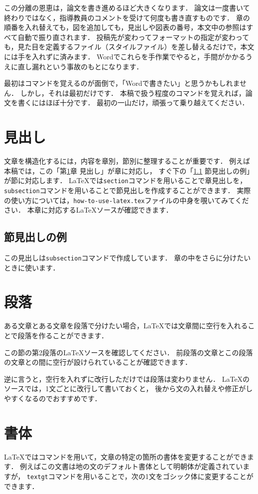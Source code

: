 \documentclass{simplepaper}
\begin{document}
この分離の恩恵は，論文を書き進めるほど大きくなります．
論文は一度書いて終わりではなく，指導教員のコメントを受けて何度も書き直すものです．
章の順番を入れ替えても，図を追加しても，見出しや図表の番号，本文中の参照はすべて自動で振り直されます．
投稿先が変わってフォーマットの指定が変わっても，見た目を定義するファイル（スタイルファイル）を差し替えるだけで，本文には手を入れずに済みます．
Wordでこれらを手作業でやると，手間がかかるうえに直し漏れという事故のもとになります．

最初はコマンドを覚えるのが面倒で，「Wordで書きたい」と思うかもしれません．
しかし，それは最初だけです．
本稿で扱う程度のコマンドを覚えれば，論文を書くにはほぼ十分です．
最初の一山だけ，頑張って乗り越えてください．


\section{見出し}
\label{sec:heading}
文章を構造化するには，内容を章別，節別に整理することが重要です．
例えば本稿では，この「第\ref{sec:heading}章 見出し」が章に対応し，
すぐ下の「\ref{sec:heading-example} 節見出しの例」が節に対応します．
LaTeXでは\texttt{section}コマンドを用いることで章見出しを，
\texttt{subsection}コマンドを用いることで節見出しを作成することができます．
実際の使い方については，\texttt{how-to-use-latex.tex}ファイルの中身を覗いてみてください．
本章に対応するLaTeXソースが確認できます．

\subsection{節見出しの例}
\label{sec:heading-example}
この見出しは\texttt{subsection}コマンドで作成しています．
章の中をさらに分けたいときに使います．


\section{段落}
ある文章とある文章を段落で分けたい場合，LaTeXでは文章間に空行を入れることで段落を作ることができます．

この節の第2段落のLaTeXソースを確認してください．
前段落の文章とこの段落の文章との間に空行が設けられていることが確認できます．

逆に言うと，空行を入れずに改行しただけでは段落は変わりません．
LaTeXのソースでは，1文ごとに改行して書いておくと，
後から文の入れ替えや修正がしやすくなるのでおすすめです．


\section{書体}
LaTeXではコマンドを用いて，文章の特定の箇所の書体を変更することができます．
例えばこの文書は地の文のデフォルト書体として明朝体が定義されていますが，
\texttt{textgt}コマンドを用いることで，次の1文をゴシック体に変更することができます．
\end{document}
